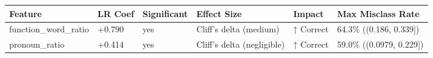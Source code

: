 \begin{tabular}{llllll}
\toprule
Feature & LR Coef & Significant & Effect Size & Impact & Max Misclass Rate \\
\midrule
function\_word\_ratio & +0.790 & yes & Cliff's delta (medium) & ↑ Correct & 64.3\% ((0.186, 0.339]) \\
pronoun\_ratio & +0.414 & yes & Cliff's delta (negligible) & ↑ Correct & 59.0\% ((0.0979, 0.229]) \\
\bottomrule
\end{tabular}
